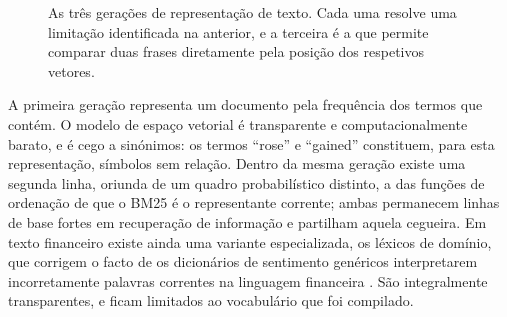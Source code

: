 \begin{figure}[htbp]
\centering
{}
\caption[Três gerações de representação de texto]{As três gerações de representação de texto. Cada
uma resolve uma limitação identificada na anterior, e a terceira é a que permite comparar duas
frases diretamente pela posição dos respetivos vetores.}
\label{fig:ctx_geracoes}
\end{figure}

A primeira geração representa um documento pela frequência dos termos que contém. O modelo de
espaço vetorial \autocite{salton1975vsm} é transparente e computacionalmente barato, e é cego a
sinónimos: os termos ``rose'' e ``gained'' constituem, para esta representação, símbolos sem
relação. Dentro da mesma geração existe uma segunda linha, oriunda de um quadro probabilístico
distinto, a das funções de ordenação de que o BM25 \autocite{robertson2009bm25} é o representante
corrente; ambas permanecem linhas de base fortes em recuperação de informação e partilham aquela
cegueira. Em texto financeiro existe ainda uma variante especializada, os léxicos de domínio, que
corrigem o facto de os dicionários de sentimento genéricos interpretarem incorretamente palavras
correntes na linguagem financeira \autocite{loughran2011liability}. São integralmente
transparentes, e ficam limitados ao vocabulário que foi compilado.

